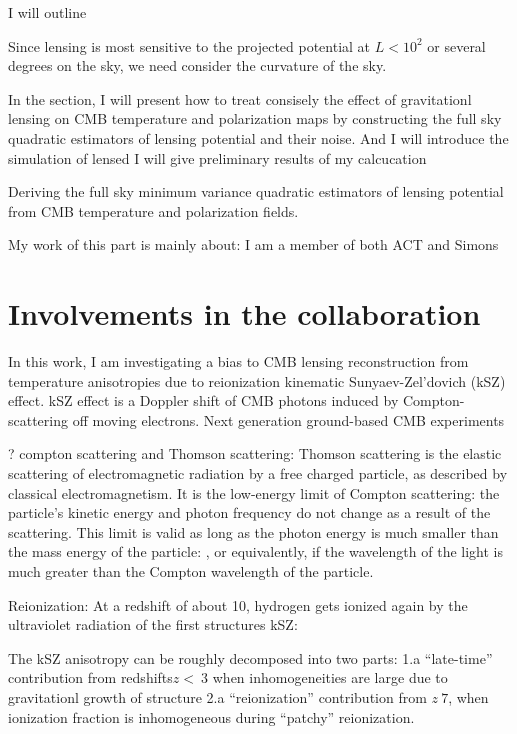 \documentclass[12pt, notitlepage, onecolumn, amsmath, amssymb, aps]{revtex4-1}
\begin{document}
I will outline 

Since lensing is most sensitive to the projected potential at \(L<10^2\) or several degrees on the sky, we need consider the curvature of the sky. 


In the section, I will present how to treat consisely the effect of gravitationl lensing on CMB temperature and polarization maps by constructing the full sky quadratic estimators of lensing potential and their noise. And I will introduce the simulation of lensed I will give preliminary results of my calcucation 

Deriving the full sky minimum variance quadratic estimators of lensing potential from CMB temperature and polarization fields.

My work of this part is mainly about:
I am a member of both ACT and Simons

\section{Involvements in the collaboration}
\label{sec:org093d799}

In this work, I am investigating a bias to CMB lensing reconstruction from temperature anisotropies due to reionization kinematic Sunyaev-Zel'dovich (kSZ) effect. kSZ effect is a Doppler shift of CMB photons induced by Compton-scattering off moving electrons. Next generation ground-based CMB experiments 

? compton scattering and Thomson scattering: Thomson scattering is the elastic scattering of electromagnetic radiation by a free charged particle, as described by classical electromagnetism. It is the low-energy limit of Compton scattering: the particle's kinetic energy and photon frequency do not change as a result of the scattering. This limit is valid as long as the photon energy is much smaller than the mass energy of the particle: , or equivalently, if the wavelength of the light is much greater than the Compton wavelength of the particle.

Reionization: At a redshift of about 10, hydrogen gets ionized again by the ultraviolet radiation of the first structures
kSZ: 

The kSZ anisotropy can be roughly decomposed into two parts: 1.a ``late-time'' contribution from redshifts\(z<~3\) when inhomogeneities are large due to gravitationl growth of structure 2.a ``reionization'' contribution from \(z~7\), when ionization fraction is inhomogeneous during ``patchy'' reionization.\cite{Ferraro:2017fac}
\end{document}
